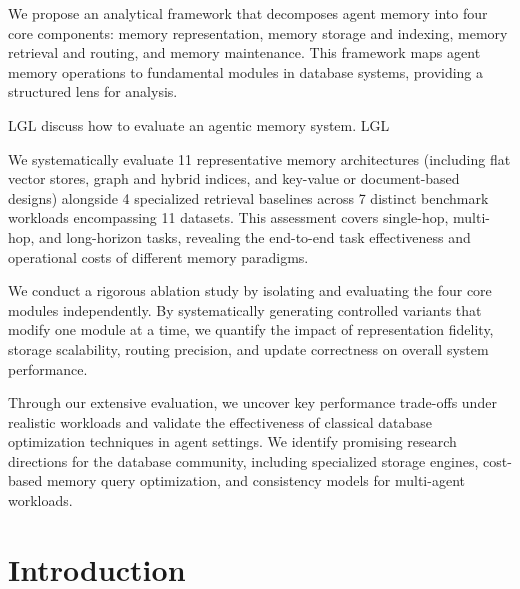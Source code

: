 \documentclass{llmxive}
\providecommand{\lgl}[1]{LGL #1 LGL}
\begin{document}
\noindent  We propose an analytical framework that decomposes agent memory into four core components: memory representation, memory storage and indexing, memory retrieval and routing, and memory maintenance. This framework maps agent memory operations to fundamental modules in database systems, providing a structured lens for analysis.

\lgl{discuss how to evaluate an agentic memory system.}

\noindent  We systematically evaluate 11 representative memory architectures (including flat vector stores, graph and hybrid indices, and key-value or document-based designs) alongside 4 specialized retrieval baselines across 7 distinct benchmark workloads encompassing 11 datasets. This assessment covers single-hop, multi-hop, and long-horizon tasks, revealing the end-to-end task effectiveness and operational costs of different memory paradigms.

\noindent  We conduct a rigorous ablation study by isolating and evaluating the four core modules independently. By systematically generating controlled variants that modify one module at a time, we quantify the impact of representation fidelity, storage scalability, routing precision, and update correctness on overall system performance.

\noindent  Through our extensive evaluation, we uncover key performance trade-offs under realistic workloads and validate the effectiveness of classical database optimization techniques in agent settings. We identify promising research directions for the database community, including specialized storage engines, cost-based memory query optimization, and consistency models for multi-agent workloads.
\fi








\iffalse
\section{Introduction}
\label{sec:intro}


\end{document}
